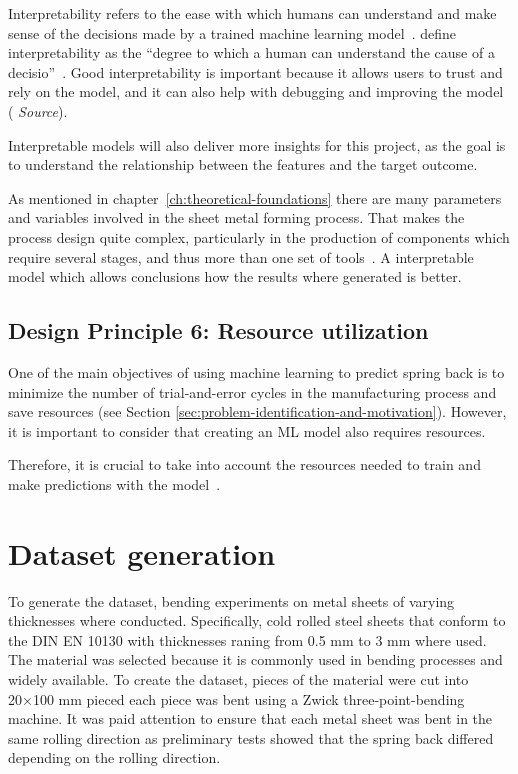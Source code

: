 Interpretability refers to the ease with which humans can understand and make
sense of the decisions made by a trained machine learning model~\cite[p. 13]{
    molnar2020interpretable}.
\cite{miller2019explanation} define interpretability as the ``degree to which
a human can understand the cause of a decisio''~\cite[p. 1]{miller2019explanation}.
Good interpretability is important because it allows users to trust and rely
on the model, and it can also help with debugging and improving the model (\textit{
    Source}).

Interpretable models will also deliver more insights for this project, as the
goal is to understand the relationship between the features and the target outcome.

As mentioned in chapter~\ref{ch:theoretical-foundations} there are many parameters
and variables involved in the sheet metal forming process.
That makes the process design quite complex, particularly in the production
of components which require several stages, and thus more than one set of tools~\cite[p.
1]{dib_singleensembleclassifiers_2020}.
A interpretable model which allows conclusions how the results where generated is better.

\subsection*{Design Principle 6: Resource utilization}
One of the main objectives of using machine learning to predict spring back is to
minimize the number of trial-and-error cycles in the manufacturing process and save
resources (see Section \ref{sec:problem-identification-and-motivation}). However, it is
important to consider that creating an ML model also requires resources.

Therefore, it
is crucial to take into account the resources needed to train and make predictions with
the model~\cite[p. 16]{siebert2022construction}.


\section{Dataset generation}\label{sec:dataset-generation}

To generate the dataset, bending experiments on metal sheets of varying
thicknesses where conducted.
Specifically, cold rolled steel sheets that conform to the DIN EN
10130 with thicknesses raning from 0.5 mm to 3 mm where used.
The material was selected because it is commonly used in bending processes and widely
available.
To create the dataset, pieces of the material were cut into 20×100 mm pieced each piece
was bent using a Zwick three-point-bending machine.
It was paid attention to ensure that each metal sheet was bent in the same
rolling direction as preliminary tests showed that the spring back differed depending
on the rolling direction.

